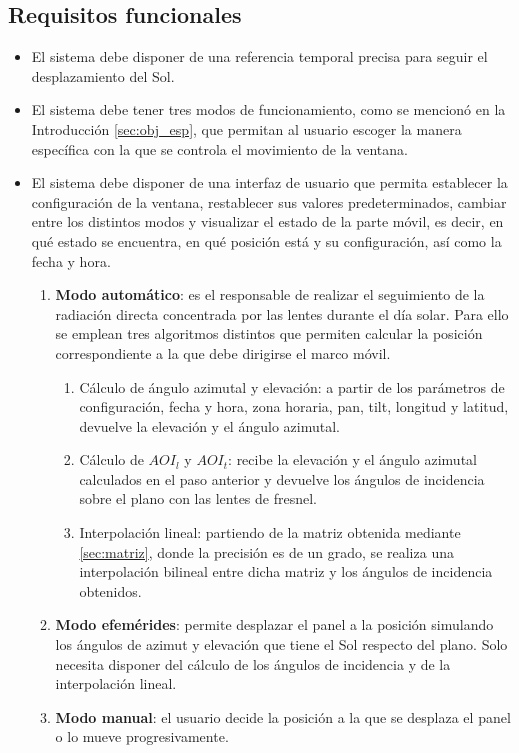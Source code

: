 \subsection{Requisitos funcionales} 
\begin{itemize}
	\item El sistema debe disponer de una referencia temporal precisa para seguir el desplazamiento del Sol.
	\item El sistema debe tener tres modos de funcionamiento, como se mencionó en la Introducción \ref{sec:obj_esp}, que permitan al usuario escoger la manera específica con la que se controla el movimiento de la ventana.
	\item El sistema debe disponer de una interfaz de usuario que permita establecer la configuración de la ventana, restablecer sus valores predeterminados, cambiar entre los distintos modos y visualizar el estado de la parte móvil, es decir, en qué estado se encuentra, en qué posición está y su configuración, así como la fecha y hora.
	\begin{enumerate}
		\item \textbf{Modo automático}: es el responsable de realizar el seguimiento de la radiación directa concentrada por las lentes durante el día solar. Para ello se emplean tres algoritmos distintos que permiten calcular la posición correspondiente a la que debe dirigirse el marco móvil.
			\begin{enumerate}
				\item Cálculo de ángulo azimutal y elevación: a partir de los parámetros de configuración, fecha y hora, zona horaria, pan, tilt, longitud y latitud, devuelve la elevación y el ángulo azimutal.
				\item Cálculo de $AOI_l$ y $AOI_t$: recibe la elevación y el ángulo azimutal calculados en el paso anterior y devuelve los ángulos de incidencia sobre el plano con las lentes de fresnel.
				\item Interpolación lineal: %
				partiendo de la matriz obtenida mediante \ref{sec:matriz}, donde la precisión es de un grado, se realiza una interpolación bilineal entre dicha matriz y los ángulos de incidencia obtenidos.
			\end{enumerate} 
		\item \textbf{Modo efemérides}: permite desplazar el panel a la posición simulando los ángulos de azimut y elevación que tiene el Sol respecto del plano. Solo necesita disponer del cálculo de los ángulos de incidencia y de la interpolación lineal.   
		\item \textbf{Modo manual}: el usuario decide la posición a la que se desplaza el panel o lo mueve progresivamente.  
	\end{enumerate}	
\end{itemize}


